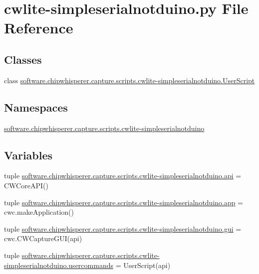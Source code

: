 \hypertarget{cwlite-simpleserialnotduino_8py}{}\section{cwlite-\/simpleserialnotduino.py File Reference}
\label{cwlite-simpleserialnotduino_8py}
\subsection*{Classes}
\begin{DoxyCompactItemize}
\item 
class \hyperlink{classsoftware_1_1chipwhisperer_1_1capture_1_1scripts_1_1cwlite-simpleserialnotduino_1_1UserScript}{software.\+chipwhisperer.\+capture.\+scripts.\+cwlite-\/simpleserialnotduino.\+User\+Script}
\end{DoxyCompactItemize}
\subsection*{Namespaces}
\begin{DoxyCompactItemize}
\item 
 \hyperlink{namespacesoftware_1_1chipwhisperer_1_1capture_1_1scripts_1_1cwlite-simpleserialnotduino}{software.\+chipwhisperer.\+capture.\+scripts.\+cwlite-\/simpleserialnotduino}
\end{DoxyCompactItemize}
\subsection*{Variables}
\begin{DoxyCompactItemize}
\item 
tuple \hyperlink{namespacesoftware_1_1chipwhisperer_1_1capture_1_1scripts_1_1cwlite-simpleserialnotduino_a0c9ed2654c291d4613bdc37fc846be35}{software.\+chipwhisperer.\+capture.\+scripts.\+cwlite-\/simpleserialnotduino.\+api} = C\+W\+Core\+A\+P\+I()
\item 
tuple \hyperlink{namespacesoftware_1_1chipwhisperer_1_1capture_1_1scripts_1_1cwlite-simpleserialnotduino_aad456a539011c4f030350840006d71ba}{software.\+chipwhisperer.\+capture.\+scripts.\+cwlite-\/simpleserialnotduino.\+app} = cwc.\+make\+Application()
\item 
tuple \hyperlink{namespacesoftware_1_1chipwhisperer_1_1capture_1_1scripts_1_1cwlite-simpleserialnotduino_a44764f6dc1cf953e93456f4075da5ee2}{software.\+chipwhisperer.\+capture.\+scripts.\+cwlite-\/simpleserialnotduino.\+gui} = cwc.\+C\+W\+Capture\+G\+U\+I(api)
\item 
tuple \hyperlink{namespacesoftware_1_1chipwhisperer_1_1capture_1_1scripts_1_1cwlite-simpleserialnotduino_a97e6b9bfaa7a9bbe9d14dd2f28d218b0}{software.\+chipwhisperer.\+capture.\+scripts.\+cwlite-\/simpleserialnotduino.\+usercommands} = User\+Script(api)
\end{DoxyCompactItemize}
